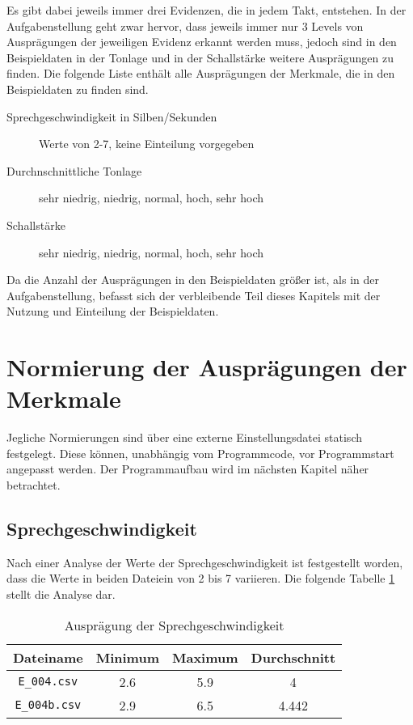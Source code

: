 Es gibt dabei jeweils immer drei Evidenzen, die in jedem Takt, entstehen. In der Aufgabenstellung geht zwar hervor, dass jeweils immer nur 3 Levels von Ausprägungen der jeweiligen Evidenz erkannt werden muss, jedoch sind in den Beispieldaten in der Tonlage und in der Schallstärke weitere Ausprägungen zu finden. Die folgende Liste enthält alle Ausprägungen der Merkmale, die in den Beispieldaten zu finden sind. 

\begin{description}
  \item [Sprechgeschwindigkeit in Silben/Sekunden] Werte von 2-7, keine Einteilung vorgegeben
  \item [Durchnschnittliche Tonlage] sehr niedrig, niedrig, normal, hoch, sehr hoch
  \item [Schallstärke] sehr niedrig, niedrig, normal, hoch, sehr hoch
\end{description}

Da die Anzahl der Ausprägungen in den Beispieldaten größer ist, als in der Aufgabenstellung, befasst sich der verbleibende Teil dieses Kapitels mit der Nutzung und Einteilung der Beispieldaten.

\section{Normierung der Ausprägungen der Merkmale}
Jegliche Normierungen sind über eine externe Einstellungsdatei statisch festgelegt. Diese können, unabhängig vom Programmcode, vor Programmstart angepasst werden. Der Programmaufbau wird im nächsten Kapitel näher betrachtet.

\subsection{Sprechgeschwindigkeit}
\label{sprechgeschwindigkeit_auspr}
Nach einer Analyse der Werte der Sprechgeschwindigkeit ist festgestellt worden, dass die Werte in beiden Dateiein von 2 bis 7 variieren. Die folgende Tabelle \ref{tab:sprechgeschwdingikeit} stellt die Analyse dar. 

\begin{table}[h]
\begin{tabular}{ c | c | c | c}
  Dateiname & Minimum & Maximum & Durchschnitt \\
  \hline 
  \verb|E_004.csv|  & 2.6 & 5.9 & 4 \\
  \verb|E_004b.csv| & 2.9 & 6.5 & 4.442 \\
\end{tabular}
\caption{Ausprägung der Sprechgeschwindigkeit}
\label{tab:sprechgeschwdingikeit}
\end{table}

